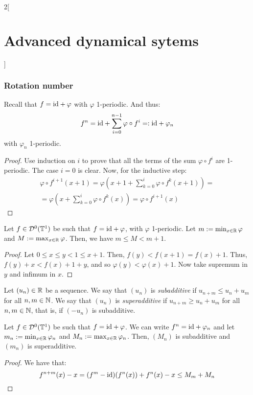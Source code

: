 \documentclass[../../../main_math.tex]{subfiles}
\begin{document}
\begin{multicols}{2}[\section{Advanced dynamical sytems}]
  \subsubsection{Rotation number}\label{ADS:rotation_number_section}
  \begin{lemma}
    Recall that $f=\mathrm{id}+\varphi$ with $\varphi$ 1-periodic. And thus:
    $$
      f^n=\mathrm{id} + \sum_{i=0}^{n-1} \varphi\circ f^i=: \mathrm{id} + \varphi_n
    $$
    with $\varphi_n$ 1-periodic.
  \end{lemma}
  \begin{proof}
    Use induction on $i$ to prove that all the terms of the sum $\varphi\circ f^i$ are 1-periodic. The case $i=0$ is clear. Now, for the inductive step:
    \begin{multline*}
      \varphi\circ f^{i+1}(x+1)=\varphi\left(x+1+\sum_{k=0}^{i}\varphi\circ f^k(x+1)\right)=\\=\varphi\left( x+\sum_{k=0}^{i}\varphi\circ f^k(x)\right)=\varphi\circ f^{i+1}(x)
    \end{multline*}
  \end{proof}
  \begin{lemma}\label{ADS:lema1}
    Let $f\in \mathcal{D}^0(\mathbb{T}^1)$ be such that $f=\mathrm{id} +\varphi$, with $\varphi$ 1-periodic. Let $m:=\min_{x\in\mathbb{R}}\varphi$ and $M:=\max_{x\in\mathbb{R}}\varphi$. Then, we have $m\leq M< m+1$.
  \end{lemma}
  \begin{proof}
    Let $0\leq x\leq y<1\leq x+1$. Then, $f(y)<f(x+1)=f(x)+1$. Thus, $f(y)+x< f(x)+1+y$, and so $\varphi(y) < \varphi(x)+1$. Now take supremum in $y$ and infimum in $x$.
  \end{proof}
  \begin{definition}
    Let ${(u_n)}\in\mathbb{R}$ be a sequence. We say that $(u_n)$ is \emph{subadditive} if $u_{n+m}\leq u_n+u_m$ for all $n,m\in\mathbb{N}$. We say that $(u_n)$ is \emph{superadditive} if $u_{n+m}\geq u_n+u_m$ for all $n,m\in\mathbb{N}$, that is, if $(-u_n)$ is subadditive.
  \end{definition}
  \begin{lemma}\label{ADS:lema2}
    Let $f\in \mathcal{D}^0(\mathbb{T}^1)$ be such that $f=\mathrm{id} +\varphi$. We can write $f^n=\mathrm{id} +\varphi_n$ and let $m_n:=\min_{x\in\mathbb{R}}\varphi_n$ and $M_n:=\max_{x\in\mathbb{R}}\varphi_n$. Then, $(M_n)$ is subadditive and $(m_n)$ is superadditive.
  \end{lemma}
  \begin{proof}
    We have that:
    \begin{equation*}
      f^{n+m}(x)-x=(f^m-\id)(f^n(x))+f^n(x)-x\leq M_m+M_n

\end{equation*}
\end{proof}
\end{multicols}
\end{document}
